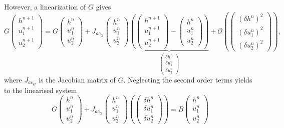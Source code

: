 \documentclass[a4paper, 11pt]{article}
\begin{document}
However, 
a linearization of $G$ gives
\begin{equation*}
G\begin{pmatrix}h^{n+1}\\u_1^{n+1}\\u_2^{n+1}\end{pmatrix}=G\begin{pmatrix}h^{n}\\u_1^{n}\\u_2^{n}\end{pmatrix}+J_{ac_G}\begin{pmatrix}h^n\\u_1^n\\u_2^n\end{pmatrix}\underbrace{\left(\begin{pmatrix}h^{n+1}\\u_1^{n+1}\\u_2^{n+1}\end{pmatrix}-\begin{pmatrix}h^n\\u_1^n\\u_2^n\end{pmatrix}\right)}_{\begin{pmatrix}\delta h^n\\\delta u_1^n\\\delta u_2^n\end{pmatrix}}+\mathcal{O}\left(\begin{pmatrix}(\delta h^n)^2\\(\delta u_1^n)^2\\(\delta u_2^n)^2\end{pmatrix}\right),
\end{equation*}
where $J_{ac_G}$ is the Jacobian matrix of $G$.
Neglecting the second order terms yields to the linearised system
\begin{equation*}
G\begin{pmatrix}h^{n}\\u_1^{n}\\u_2^{n}\end{pmatrix}+J_{ac_G}\begin{pmatrix}h^n\\u_1^n\\u_2^n\end{pmatrix}\left(\begin{pmatrix}\delta h^n\\\delta u_1^n\\\delta u_2^n\end{pmatrix}\right)=B\begin{pmatrix}h^n\\u_1^n\\u_2^n\end{pmatrix}
\end{equation*}
\end{document}
